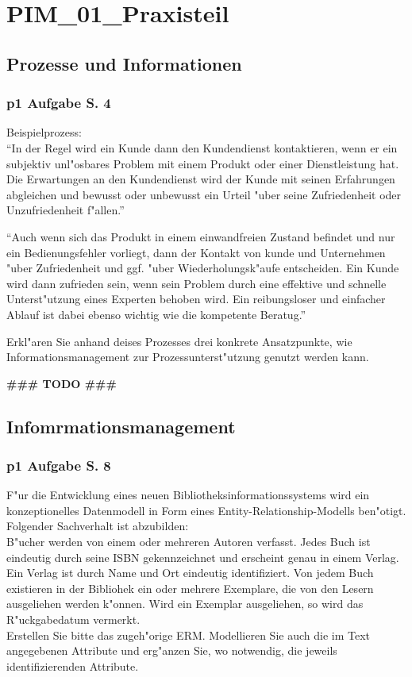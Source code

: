 
\section{PIM\_01\_Praxisteil}

\subsection{Prozesse und Informationen}

\subsubsection{p1 Aufgabe S. 4}

Beispielprozess:\\
"`In der Regel wird ein Kunde dann den Kundendienst kontaktieren, wenn er ein subjektiv unl"osbares Problem mit einem Produkt oder einer Dienstleistung hat.
Die Erwartungen an den Kundendienst wird der Kunde mit seinen Erfahrungen abgleichen und bewusst oder unbewusst ein Urteil "uber seine Zufriedenheit oder Unzufriedenheit f"allen."'
\par
"`Auch wenn sich das Produkt in einem einwandfreien Zustand befindet und nur ein Bedienungsfehler vorliegt, dann der Kontakt von kunde und Unternehmen "uber Zufriedenheit und ggf. "uber Wiederholungsk"aufe entscheiden.
Ein Kunde wird dann zufrieden sein, wenn sein Problem durch eine effektive und schnelle Unterst"utzung eines Experten behoben wird.
Ein reibungsloser und einfacher Ablauf ist dabei ebenso wichtig wie die kompetente Beratug."'
\par
Erkl"aren Sie anhand deises Prozesses drei konkrete Ansatzpunkte, wie Informationsmanagement zur Prozessunterst"utzung genutzt werden kann.


\textbf{\#\#\# TODO \#\#\#}\\



\subsection{Infomrmationsmanagement}

\subsubsection{p1 Aufgabe S. 8}

F"ur die Entwicklung eines neuen Bibliotheksinformationssystems wird ein konzeptionelles Datenmodell in Form eines Entity-Relationship-Modells ben"otigt.
Folgender Sachverhalt ist abzubilden:\\
B"ucher werden von einem oder mehreren Autoren verfasst.
Jedes Buch ist eindeutig durch seine ISBN gekennzeichnet und erscheint genau in einem Verlag.
Ein Verlag ist durch Name und Ort eindeutig identifiziert.
Von jedem Buch existieren in der Bibliohek ein oder mehrere Exemplare, die von den Lesern ausgeliehen werden k"onnen.
Wird ein Exemplar ausgeliehen, so wird das R"uckgabedatum vermerkt.\\
Erstellen Sie bitte das zugeh"orige ERM.
Modellieren Sie auch die im Text angegebenen Attribute und erg"anzen Sie, wo notwendig, die jeweils identifizierenden Attribute.


